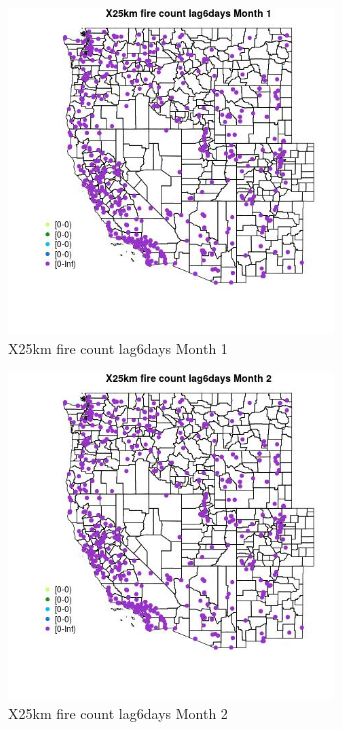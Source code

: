 \begin{figure} 
\centering  
\includegraphics[width=0.77\textwidth]{Code_Outputs/Report_ML_input_PM25_Step4_part_e_de_duplicated_aves_compiled_2019-05-14wNAs_MapObsMo1X25km_fire_count_lag6days.jpg} 
\caption{\label{fig:Report_ML_input_PM25_Step4_part_e_de_duplicated_aves_compiled_2019-05-14wNAsMapObsMo1X25km_fire_count_lag6days}X25km fire count lag6days Month 1} 
\end{figure} 
 

\begin{figure} 
\centering  
\includegraphics[width=0.77\textwidth]{Code_Outputs/Report_ML_input_PM25_Step4_part_e_de_duplicated_aves_compiled_2019-05-14wNAs_MapObsMo2X25km_fire_count_lag6days.jpg} 
\caption{\label{fig:Report_ML_input_PM25_Step4_part_e_de_duplicated_aves_compiled_2019-05-14wNAsMapObsMo2X25km_fire_count_lag6days}X25km fire count lag6days Month 2} 
\end{figure} 
 

